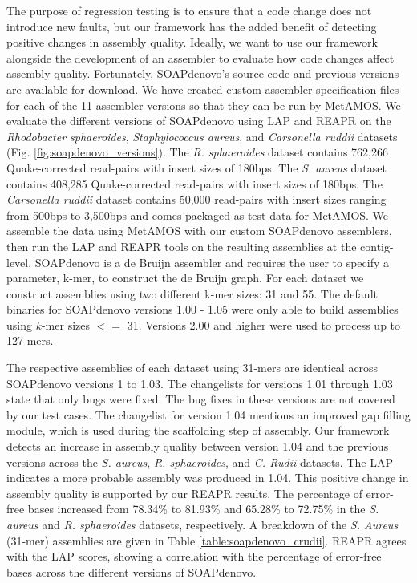 \documentclass[12pt,\mydriver]{thesis}
\begin{document}
The purpose of regression testing is to ensure that a code change does not introduce new faults, but our framework has the added benefit of detecting positive changes in assembly quality.
Ideally, we want to use our framework alongside the development of an assembler to evaluate how code changes affect assembly quality.
Fortunately, SOAPdenovo's source code and previous versions are available for download.
We have created custom assembler specification files for each of the 11 assembler versions so that they can be run by MetAMOS\cite{treangen2011metamos}.
We evaluate the different versions of SOAPdenovo using LAP and REAPR on the \emph{Rhodobacter sphaeroides}, \emph{Staphylococcus aureus}, and \emph{Carsonella ruddii} datasets (Fig. \ref{fig:soapdenovo_versions}).
The \emph{R. sphaeroides} dataset contains 762,266 Quake-corrected \cite{kelley2010quake} read-pairs with insert sizes of 180bps.
The \emph{S. aureus} dataset contains 408,285 Quake-corrected read-pairs with insert sizes of 180bps.
The \emph{Carsonella ruddii} dataset contains 50,000 read-pairs with insert sizes ranging from 500bps to 3,500bps and comes packaged as test data for MetAMOS.
We assemble the data using MetAMOS with our custom SOAPdenovo assemblers, then run the LAP and REAPR tools on the resulting assemblies at the contig-level.
SOAPdenovo is a de Bruijn assembler and requires the user to specify a parameter, k-mer, to construct the de Bruijn graph.
For each dataset we construct assemblies using two different k-mer sizes: 31 and 55.
The default binaries for SOAPdenovo versions 1.00 - 1.05 were only able to build assemblies using $k$-mer sizes $<=$ 31.
Versions 2.00 and higher were used to process up to 127-mers.

The respective assemblies of each dataset using 31-mers are identical across SOAPdenovo versions 1 to 1.03.
The changelists for versions 1.01 through 1.03 state that only bugs were fixed.
The bug fixes in these versions are not covered by our test cases.
The changelist for version 1.04 mentions an improved gap filling module, which is used during the scaffolding step of assembly.
Our framework detects an increase in assembly quality between version 1.04 and the previous versions across the \emph{S. aureus}, \emph{R. sphaeroides}, and \emph{C. Rudii} datasets.
The LAP indicates a more probable assembly was produced in 1.04.
This positive change in assembly quality is supported by our REAPR results.
The percentage of error-free bases increased from 78.34\% to 81.93\% and 65.28\% to 72.75\% in the \emph{S. aureus} and \emph{R. sphaeroides} datasets, respectively.
A breakdown of the \emph{S. Aureus} (31-mer) assemblies are given in Table \ref{table:soapdenovo_crudii}.
REAPR agrees with the LAP scores, showing a correlation with the percentage of error-free bases across the different versions of SOAPdenovo.
\end{document}
